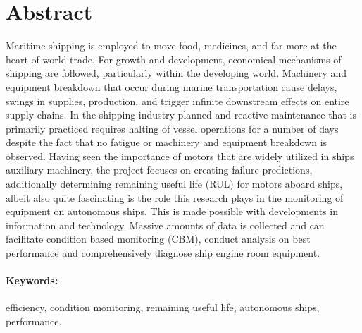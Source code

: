 
\section*{Abstract}
\label{sec:Abstract}
Maritime shipping is employed to move food, medicines, and far more at the heart of world trade. For growth and development, economical mechanisms of shipping are followed, particularly within the developing world. Machinery and equipment breakdown  that occur during marine transportation  cause delays, swings in supplies, production, and trigger infinite downstream effects on entire supply chains. In the shipping industry planned and reactive maintenance that is primarily  practiced requires halting of vessel operations for a number of days despite the fact that no fatigue or machinery and equipment breakdown is observed.
Having seen  the importance of motors that are widely utilized in ships auxiliary machinery, the project focuses on creating failure predictions, additionally determining  remaining useful  life (RUL) for motors aboard ships, albeit also quite fascinating is the role this research plays in the monitoring of equipment on autonomous ships. This is made possible with developments in information and technology. Massive amounts of data  is collected  and can facilitate condition based monitoring (CBM), conduct analysis on best performance and comprehensively diagnose ship engine room equipment.


\paragraph{\textbf{Keywords:}} efficiency, condition monitoring, remaining useful life, autonomous ships, performance.




